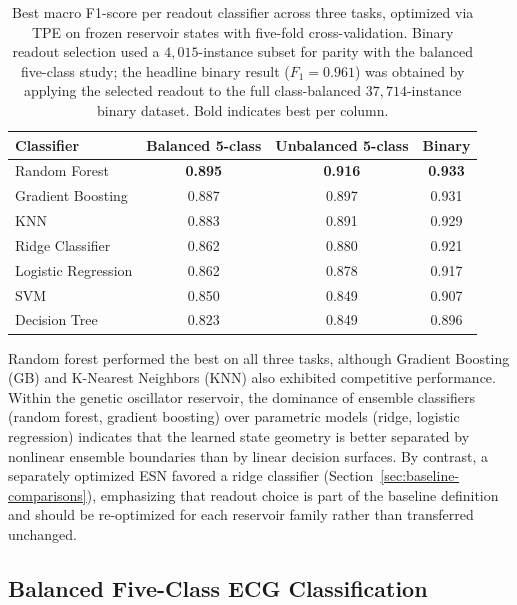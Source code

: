 \documentclass[journal=asbcd6,manuscript=article,keywords]{achemso}
\begin{document}
\begin{table}
    \centering
    \caption{Best macro F1-score per readout classifier across three tasks, optimized via TPE on frozen reservoir states with five-fold cross-validation.
    Binary readout selection used a $4{,}015$-instance subset for parity with the balanced five-class study; the headline binary result ($F_1 = 0.961$) was obtained by applying the selected readout to the full class-balanced $37{,}714$-instance binary dataset. 
    Bold indicates best per column.}
    \label{tab:readout-comparison}
    \small
    \begin{tabular}{lccc}
        \toprule
        Classifier & Balanced 5-class & Unbalanced 5-class & Binary \\
        \midrule
        Random Forest    & \textbf{0.895} & \textbf{0.916} & \textbf{0.933} \\
        Gradient Boosting & 0.887 & 0.897 & 0.931 \\
        KNN              & 0.883 & 0.891 & 0.929 \\
        Ridge Classifier & 0.862 & 0.880 & 0.921 \\
        Logistic Regression & 0.862 & 0.878 & 0.917 \\
        SVM              & 0.850 & 0.849 & 0.907 \\
        Decision Tree    & 0.823 & 0.849 & 0.896 \\
        \bottomrule
    \end{tabular}
\end{table}

Random forest performed the best on all three tasks, although Gradient Boosting (GB) and K-Nearest Neighbors (KNN) also exhibited competitive performance.
Within the genetic oscillator reservoir, the dominance of ensemble classifiers (random forest, gradient boosting) over parametric models (ridge, logistic regression) indicates that the learned state geometry is better separated by nonlinear ensemble boundaries than by linear decision surfaces. 
By contrast, a separately optimized ESN favored a ridge classifier (Section~\ref{sec:baseline-comparisons}), emphasizing that readout choice is part of the baseline definition and should be re-optimized for each reservoir family rather than transferred unchanged.

\subsection{Balanced Five-Class ECG Classification}
\end{document}
